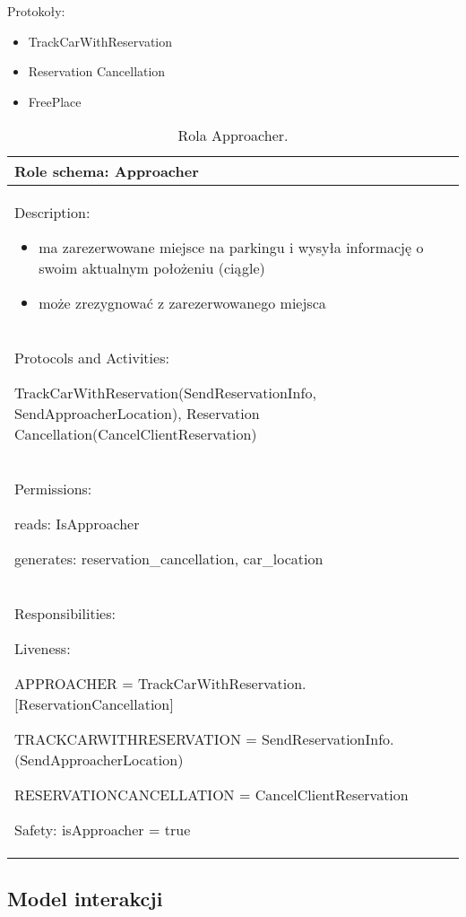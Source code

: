 Protokoły:
\begin{itemize}
    \item TrackCarWithReservation
    \item Reservation Cancellation
    \item FreePlace
\end{itemize}


\begin{table}[!h] \label{tab:rola1} \centering
    \caption{Rola Approacher.}
    \begin{tabular} {| p{14cm} |} \hline
        Role schema: Approacher \\ \hline
        Description:

        \begin{itemize}
            \item ma zarezerwowane miejsce na parkingu i wysyła informację o swoim aktualnym położeniu (ciągle)
            \item może zrezygnować z zarezerwowanego miejsca
            
        \end{itemize} \\ \hline
        Protocols and Activities: 
        
        TrackCarWithReservation(SendReservationInfo, SendApproacherLocation), Reservation Cancellation(CancelClientReservation) \\ \hline
        Permissions:

        reads: IsApproacher

        generates:  reservation\_cancellation, car\_location \\ \hline
        Responsibilities:

        Liveness: 
        
        APPROACHER = TrackCarWithReservation.[ReservationCancellation]

        TRACKCARWITHRESERVATION = SendReservationInfo.(SendApproacherLocation)

        RESERVATIONCANCELLATION = CancelClientReservation
        

        Safety: isApproacher = true \\ \hline
    \end{tabular}
\end{table}


\newpage
\subsection{Model interakcji}

